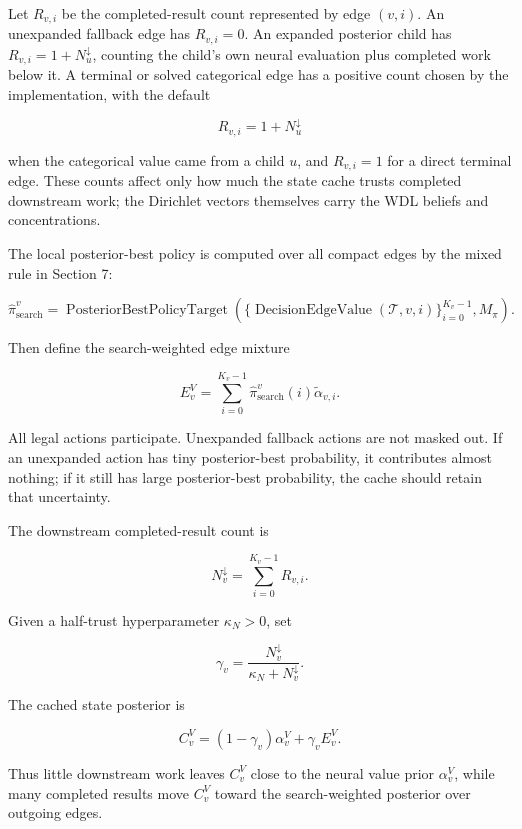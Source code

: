 \documentclass[11pt]{article}
\newcommand{\Tree}{\mathcal{T}}
\newcommand{\DecisionEdgeValue}{\operatorname{DecisionEdgeValue}}
\newcommand{\PosteriorBestPolicyTarget}{\operatorname{PosteriorBestPolicyTarget}}
\begin{document}
Let \(R_{v,i}\) be the completed-result count represented by edge \((v,i)\). An
unexpanded fallback edge has \(R_{v,i}=0\). An expanded posterior child has
\(R_{v,i}=1+N^\downarrow_u\), counting the child's own neural evaluation plus
completed work below it. A terminal or solved categorical edge has a positive
count chosen by the implementation, with the default

\[
R_{v,i}=1+N^\downarrow_u
\]

when the categorical value came from a child \(u\), and \(R_{v,i}=1\) for a direct
terminal edge. These counts affect only how much the state cache trusts
completed downstream work; the Dirichlet vectors themselves carry the WDL
beliefs and concentrations.

The local posterior-best policy is computed over all compact edges by the mixed
rule in Section 7:

\[
\hat\pi_{\mathrm{search}}^v
=
\PosteriorBestPolicyTarget
\left(
\{\DecisionEdgeValue(\Tree,v,i)\}_{i=0}^{K_v-1},M_\pi
\right).
\]

Then define the search-weighted edge mixture

\[
E^V_v
=
\sum_{i=0}^{K_v-1}
\hat\pi_{\mathrm{search}}^v(i)\widetilde\alpha_{v,i}.
\]

All legal actions participate. Unexpanded fallback actions are not masked out. If
an unexpanded action has tiny posterior-best probability, it contributes almost
nothing; if it still has large posterior-best probability, the cache should
retain that uncertainty.

The downstream completed-result count is

\[
N^\downarrow_v
=
\sum_{i=0}^{K_v-1} R_{v,i}.
\]

Given a half-trust hyperparameter \(\kappa_N>0\), set

\[
\gamma_v
=
\frac{N^\downarrow_v}{\kappa_N+N^\downarrow_v}.
\]

The cached state posterior is

\[
C^V_v
=
(1-\gamma_v)\alpha_v^V+
\gamma_v E^V_v.
\]

Thus little downstream work leaves \(C^V_v\) close to the neural value prior
\(\alpha_v^V\), while many completed results move \(C^V_v\) toward the
search-weighted posterior over outgoing edges.
\end{document}
